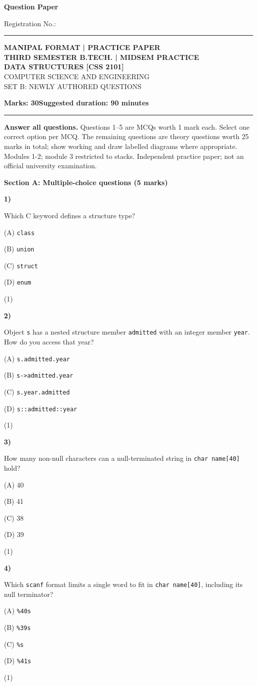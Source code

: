 \documentclass[11pt,a4paper]{article}
\newcommand{\question}[3]{\par\vspace{8pt}\noindent\begin{minipage}[t]{0.075\linewidth}\textbf{#1)}\end{minipage}\begin{minipage}[t]{0.855\linewidth}#3\end{minipage}\hfill\begin{minipage}[t]{0.055\linewidth}\raggedleft(#2)\end{minipage}\par}
\begin{document}
{\LARGE\bfseries Question Paper}\hfill {\small Registration No.: \rule{33mm}{0.3pt}}\par\vspace{8pt}
\begin{center}{\large\bfseries MANIPAL FORMAT | PRACTICE PAPER}\\[6pt]{\bfseries THIRD SEMESTER B.TECH. | MIDSEM PRACTICE}\\[4pt]{\bfseries DATA STRUCTURES [CSS 2101]}\\[4pt]{\small COMPUTER SCIENCE AND ENGINEERING}\\[3pt]{\small SET B: NEWLY AUTHORED QUESTIONS}\end{center}
\textbf{Marks: 30}\hfill\textbf{Suggested duration: 90 minutes}\par\vspace{3pt}\hrule\vspace{5pt}
{\small\textbf{Answer all questions.} Questions 1--5 are MCQs worth 1 mark each. Select one correct option per MCQ. The remaining questions are theory questions worth 25 marks in total; show working and draw labelled diagrams where appropriate. Modules 1-2; module 3 restricted to stacks. Independent practice paper; not an official university examination.}\par
\medskip\textbf{Section A: Multiple-choice questions (5 marks)}\par
\question{1}{1}{Which C keyword defines a structure type?\par (A) \texttt{class}\par (B) \texttt{union}\par (C) \texttt{struct}\par (D) \texttt{enum}}
\question{2}{1}{Object \texttt{s} has a nested structure member \texttt{admitted} with an integer member \texttt{year}. How do you access that year?\par (A) \texttt{s.admitted.year}\par (B) \texttt{s->admitted.year}\par (C) \texttt{s.year.admitted}\par (D) \texttt{s::admitted::year}}
\question{3}{1}{How many non-null characters can a null-terminated string in \texttt{char name[40]} hold?\par (A) 40\par (B) 41\par (C) 38\par (D) 39}
\question{4}{1}{Which \texttt{scanf} format limits a single word to fit in \texttt{char name[40]}, including its null terminator?\par (A) \texttt{\%40s}\par (B) \texttt{\%39s}\par (C) \texttt{\%s}\par (D) \texttt{\%41s}}
\end{document}
